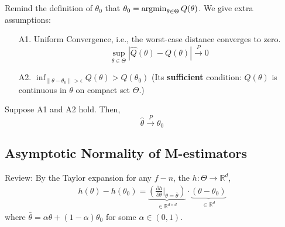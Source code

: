 \documentclass[11pt]{elegantbook}
\newcommand{\argmin}{\operatornamewithlimits{argmin}}
\begin{document}
\begin{theorem}
    Remind the definition of $\theta_0$ that $\theta_0=\argmin_{\theta\in\Theta} Q(\theta)$. We give extra assumptions:
    \begin{enumerate}
        \item[A1.] Uniform Convergence, i.e., the worst-case distance converges to zero. $$\sup_{\theta\in\Theta}|\hat{Q}(\theta)-Q(\theta)| \stackrel{P}{\longrightarrow} 0$$
        \item[A2.] $\inf_{\|\theta-\theta_0\|>\epsilon}Q(\theta)> Q(\theta_0)$ (Its \textbf{sufficient} condition: $Q(\theta)$ is continuous in $\theta$ on compact set $\Theta$.)
    \end{enumerate}
    Suppose A1 and A2 hold. Then, $$\hat{\theta} \stackrel{P}{\longrightarrow} \theta_0$$
\end{theorem}

\subsection{Asymptotic Normality of M-estimators}
Review: By the Taylor expansion for any $f-n$, the $h: \Theta \rightarrow \mathbb{R}^d$,
\begin{equation}
    \begin{aligned}
        h(\theta)-h(\theta_0)=\underbrace{\left(\frac{\partial h}{\partial \theta}\big|_{\theta=\bar{\theta}}\right)}_{\in \mathbb{R}^{d\times d}}\cdot\underbrace{(\theta-\theta_0)}_{\in \mathbb{R}^d}
    \end{aligned}
    \nonumber
\end{equation}
where $\bar{\theta}=\alpha\theta+(1-\alpha)\theta_0$ for some $\alpha\in (0,1)$.
\end{document}
